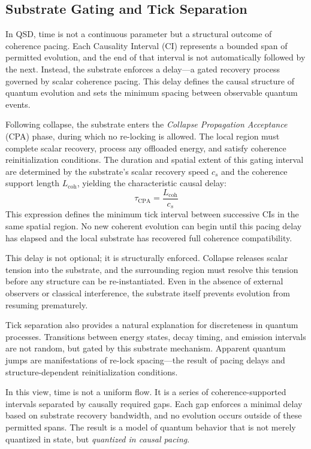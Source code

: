 \documentclass[preprints,article,submit,pdftex,moreauthors]{Definitions/mdpi}
\begin{document}
\subsection{Substrate Gating and Tick Separation}

In QSD, time is not a continuous parameter but a structural outcome of coherence pacing. Each Causality Interval (CI) represents a bounded span of permitted evolution, and the end of that interval is not automatically followed by the next. Instead, the substrate enforces a delay---a gated recovery process governed by scalar coherence pacing. This delay defines the causal structure of quantum evolution and sets the minimum spacing between observable quantum events.

Following collapse, the substrate enters the \emph{Collapse Propagation Acceptance} (CPA) phase, during which no re-locking is allowed. The local region must complete scalar recovery, process any offloaded energy, and satisfy coherence reinitialization conditions. The duration and spatial extent of this gating interval are determined by the substrate’s scalar recovery speed $c_s$ and the coherence support length $L_{\text{coh}}$, yielding the characteristic causal delay:
\[
\tau_{\text{CPA}} = \frac{L_{\text{coh}}}{c_s}
\]
This expression defines the minimum tick interval between successive CIs in the same spatial region. No new coherent evolution can begin until this pacing delay has elapsed and the local substrate has recovered full coherence compatibility.

This delay is not optional; it is structurally enforced. Collapse releases scalar tension into the substrate, and the surrounding region must resolve this tension before any structure can be re-instantiated. Even in the absence of external observers or classical interference, the substrate itself prevents evolution from resuming prematurely.

Tick separation also provides a natural explanation for discreteness in quantum processes. Transitions between energy states, decay timing, and emission intervals are not random, but gated by this substrate mechanism. Apparent quantum jumps are manifestations of re-lock spacing---the result of pacing delays and structure-dependent reinitialization conditions.

In this view, time is not a uniform flow. It is a series of coherence-supported intervals separated by causally required gaps. Each gap enforces a minimal delay based on substrate recovery bandwidth, and no evolution occurs outside of these permitted spans. The result is a model of quantum behavior that is not merely quantized in state, but \emph{quantized in causal pacing}.
\end{document}
